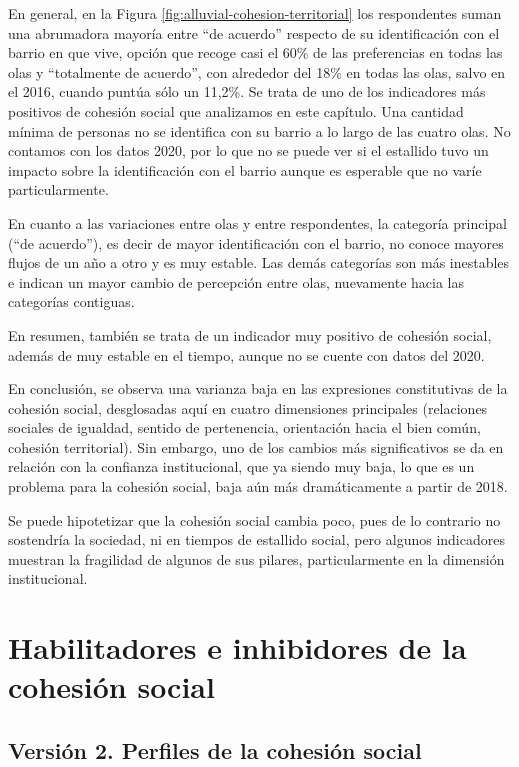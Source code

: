 \documentclass[
  12pt,
]{book}
\begin{document}
En general, en la Figura \ref{fig:alluvial-cohesion-territorial} los respondentes suman una abrumadora mayoría entre ``de acuerdo'' respecto de su identificación con el barrio en que vive, opción que recoge casi el 60\% de las preferencias en todas las olas y ``totalmente de acuerdo'', con alrededor del 18\% en todas las olas, salvo en el 2016, cuando puntúa sólo un 11,2\%. Se trata de uno de los indicadores más positivos de cohesión social que analizamos en este capítulo. Una cantidad mínima de personas no se identifica con su barrio a lo largo de las cuatro olas. No contamos con los datos 2020, por lo que no se puede ver si el estallido tuvo un impacto sobre la identificación con el barrio aunque es esperable que no varíe particularmente.

En cuanto a las variaciones entre olas y entre respondentes, la categoría principal (``de acuerdo''), es decir de mayor identificación con el barrio, no conoce mayores flujos de un año a otro y es muy estable. Las demás categorías son más inestables e indican un mayor cambio de percepción entre olas, nuevamente hacia las categorías contiguas.

En resumen, también se trata de un indicador muy positivo de cohesión social, además de muy estable en el tiempo, aunque no se cuente con datos del 2020.

En conclusión, se observa una varianza baja en las expresiones constitutivas de la cohesión social, desglosadas aquí en cuatro dimensiones principales (relaciones sociales de igualdad, sentido de pertenencia, orientación hacia el bien común, cohesión territorial). Sin embargo, uno de los cambios más significativos se da en relación con la confianza institucional, que ya siendo muy baja, lo que es un problema para la cohesión social, baja aún más dramáticamente a partir de 2018.

Se puede hipotetizar que la cohesión social cambia poco, pues de lo contrario no sostendría la sociedad, ni en tiempos de estallido social, pero algunos indicadores muestran la fragilidad de algunos de sus pilares, particularmente en la dimensión institucional.

\hypertarget{habilitadores-e-inhibidores-de-la-cohesiuxf3n-social}{%
\chapter{Habilitadores e inhibidores de la cohesión social}\label{habilitadores-e-inhibidores-de-la-cohesiuxf3n-social}}

\hypertarget{versiuxf3n-2.-perfiles-de-la-cohesiuxf3n-social}{%
\section{Versión 2. Perfiles de la cohesión social}\label{versiuxf3n-2.-perfiles-de-la-cohesiuxf3n-social}}
\end{document}
